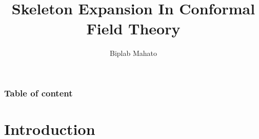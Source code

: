 \documentclass[pdf]{beamer}
\title{Skeleton Expansion In Conformal Field Theory}
\author{Biplab Mahato}
\institute{IISc}
\begin{document}
        \frame{\titlepage}


        \begin{frame}
            \frametitle{Table of content}
            \tableofcontents
        \end{frame}

        \section{Introduction}
\end{document}

